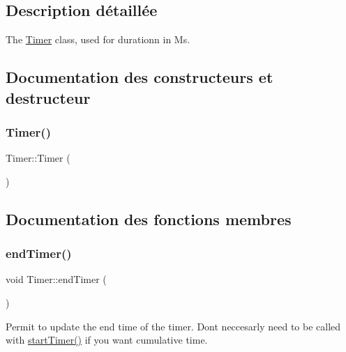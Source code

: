 \subsection{Description détaillée}
The \hyperlink{class_timer}{Timer} class, used for durationn in Ms. 

\subsection{Documentation des constructeurs et destructeur}
\mbox{\label{class_timer_a8ed3c5e074223900c0c9a74376471209}} 
\subsubsection{\texorpdfstring{Timer()}{Timer()}}
{\footnotesize\ttfamily Timer\+::\+Timer (\begin{DoxyParamCaption}{ }\end{DoxyParamCaption})\hspace{0.3cm}{\ttfamily [default]}}



\subsection{Documentation des fonctions membres}
\mbox{\label{class_timer_aef101eede3d1689a55f25f7164ecafcd}} 
\subsubsection{\texorpdfstring{end\+Timer()}{endTimer()}}
{\footnotesize\ttfamily void Timer\+::end\+Timer (\begin{DoxyParamCaption}{ }\end{DoxyParamCaption})\hspace{0.3cm}{\ttfamily [inline]}}



Permit to update the end time of the timer. Don\textquotesingle{}t neccesarly need to be called with \hyperlink{class_timer_aa8c887576ec3b0d68c10ebf4097c367c}{start\+Timer()} if you want cumulative time. 

\mbox{\label{class_timer_a70eb18ad272faecc82c376c590d1ae4a}} 
